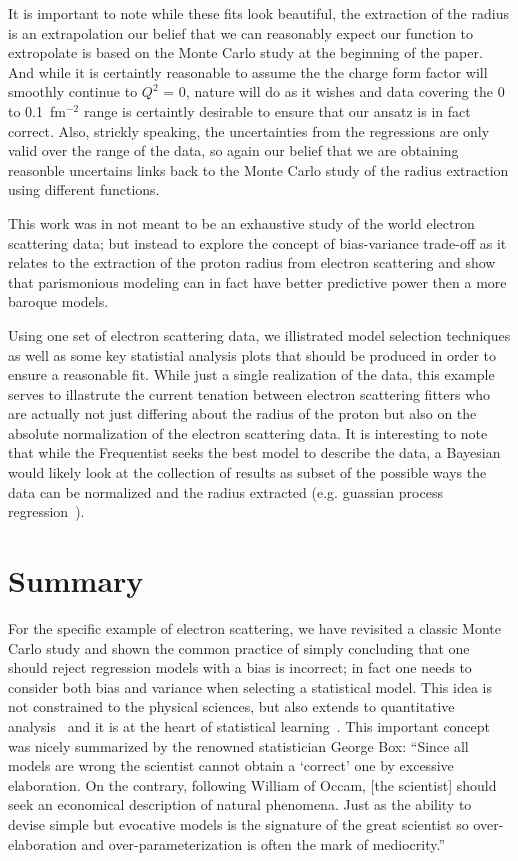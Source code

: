 \documentclass[10pt,aps,prc,twocolumn]{revtex4-1}
\begin{document}
It is important to note while these fits look beautiful, the extraction of the radius is an
extrapolation our belief that we can reasonably expect our function to extropolate is based
on the Monte Carlo study at the beginning of the paper.    And while it is certaintly reasonable
to assume the the charge form factor will smoothly continue to $Q^2$ = 0,
nature will do as it wishes and data covering the 0 to 0.1~fm$^{-2}$ range is 
certaintly desirable to ensure that our ansatz is in fact correct.   Also, strickly speaking, the
uncertainties from the regressions are only valid over the range of the data, so again our 
belief that we are obtaining reasonble uncertains links back to the Monte Carlo study of the
radius extraction using different functions.

This work was in not meant to be an exhaustive study of the world electron scattering data; but 
instead to explore the concept of bias-variance trade-off as it relates to the extraction of the proton 
radius from electron scattering and show that parismonious modeling can in fact have better 
predictive power then a more baroque models.   

Using one set of electron scattering data, we illistrated model selection techniques as well as 
some key statistial analysis plots that should be produced in order to ensure a reasonable fit.   
While just a single realization of the data, this example serves to illastrute the current tenation 
between electron scattering fitters who are actually not just differing about the radius of the
proton but also on the absolute normalization of the electron scattering data.
It is interesting to note that while the Frequentist
seeks the best model to describe the data, a Bayesian would likely look at the collection of results as  
subset of the possible ways the data can be normalized and the radius extracted (e.g. guassian process 
regression~\cite{Rasmussen:2005}).    


\section{Summary}

For the specific example of electron scattering, we have revisited a classic Monte Carlo study and shown
the common practice of simply concluding that one should reject regression models with a bias is incorrect; 
in fact one needs to consider both bias and variance when selecting a statistical model.   
This idea is not constrained to the physical sciences, but also extends 
to quantitative analysis~\cite{Brighton:2015} and it is at the heart of statistical 
learning~\cite{Hastie:2009}.
This important concept was nicely summarized by the renowned statistician George Box: 
``Since all models are wrong the scientist cannot obtain a `correct' one
by excessive elaboration.  On the contrary, following William of Occam, 
[the scientist] should seek an economical description of natural phenomena. 
Just as the ability to devise simple but evocative models is the signature of the
great scientist so over-elaboration and over-parameterization is often
the mark of mediocrity.''~\cite{Box76}
\end{document}
